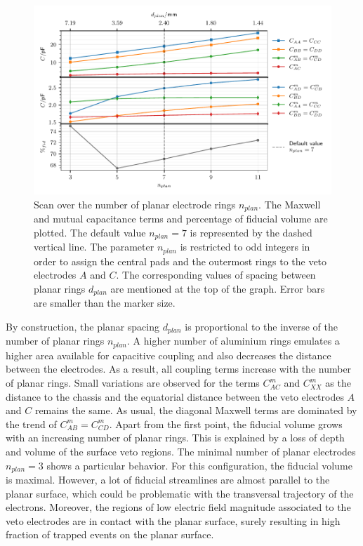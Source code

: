 \begin{figure}
\centering
\includegraphics[scale=1]{Figures/ElectrodesScan/capacitance_fiducial_n_top.pdf}
\caption{Scan over the number of planar electrode rings $n_{plan}$. The Maxwell and mutual capacitance terms and percentage of fiducial volume are plotted. The default value $n_{plan}=7$ is represented by the dashed vertical line. The parameter $n_{plan}$ is restricted to odd integers in order to assign the central pads and the outermost rings to the veto electrodes $A$ and $C$. The corresponding values of spacing between planar rings $d_{plan}$ are mentioned at the top of the graph. Error bars are smaller than the marker size.}
\label{fig:capacitance-fiducial-n-top}
\end{figure}

By construction, the planar spacing $d_{plan}$ is proportional to the inverse of the number of planar rings $n_{plan}$. A higher number of aluminium rings emulates a higher area available for capacitive coupling and also decreases the distance between the electrodes. As a result, all coupling terms increase with the number of planar rings. Small variations are observed for the terms $C_{AC}^m$ and $C_{XX}^m$ as the distance to the chassis  and the equatorial distance between the veto electrodes $A$ and $C$ remains the same. As usual, the diagonal Maxwell terms are dominated by the trend of $C_{AB}^m=C_{CD}^m$.
Apart from the first point, the fiducial volume grows with an increasing number of planar rings. This is explained by a loss of depth and volume of the surface veto regions. 
The minimal number of planar electrodes $n_{plan}=3$ shows a particular behavior. For this configuration, the fiducial volume is maximal. However, a lot of fiducial streamlines are almost parallel to the planar surface, which could be problematic with the transversal trajectory of the electrons. Moreover, the regions of low electric field magnitude associated to the veto electrodes are in contact with the planar surface, surely resulting in high fraction of trapped events on the planar surface. 

